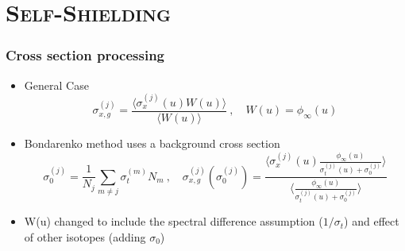 \documentclass[xcolor=x11names,compress, handout]{beamer}
\renewcommand{\(}{\begin{columns}}
\renewcommand{\)}{\end{columns}}
\newcommand{\<}[1]{\begin{column}{#1}}
\renewcommand{\>}{\end{column}}
\newcommand{\micro}{\ensuremath{\sigma}}
\begin{document}
\section{\scshape Self-Shielding}
\begin{frame}[fragile]
  \frametitle{Cross section processing \cite{Bondarenko1964}}

	\begin{itemize}
	\item General Case
	\begin{equation}
  	\micro_{x,g}^{(j)} = \frac{\langle \micro_x^{(j)}(u) W(u)\rangle}
	{\langle W(u)\rangle} \:, \quad W(u) = \phi_{\infty}(u) \nonumber
 	 \label{eq:baseBondarenko}
 	\end{equation} 
 	
 	\pause
 	\item Bondarenko method uses a background cross section
 	\begin{equation}
  	\micro_0^{(j)} = \frac{1}{N_j} \sum_{m \ne j} \micro_{t}^{(m)} N_m 
  	\:, \quad \micro_{x,g}^{(j)}(\micro_0^{(j)}) = \frac{\langle
  	 \micro_{x}^{(j)}(u) \frac{\phi_{\infty}(u)} {\micro_{t}^{(j)}(u)
  	 + \micro_0^{(j)}} \rangle}
  	 { \langle \frac{\phi_{\infty}(u)}{\micro_{t}^{(j)}(u) +
  	 \micro_0^{(j)}}\rangle} \nonumber
  \label{eq:ssfact}
	\end{equation}
	\item W(u) changed to include the spectral difference assumption ($1/\sigma_t$) and effect of other isotopes (adding $\sigma_0$)
	\end{itemize}
	
\end{frame}
	
\end{document}
